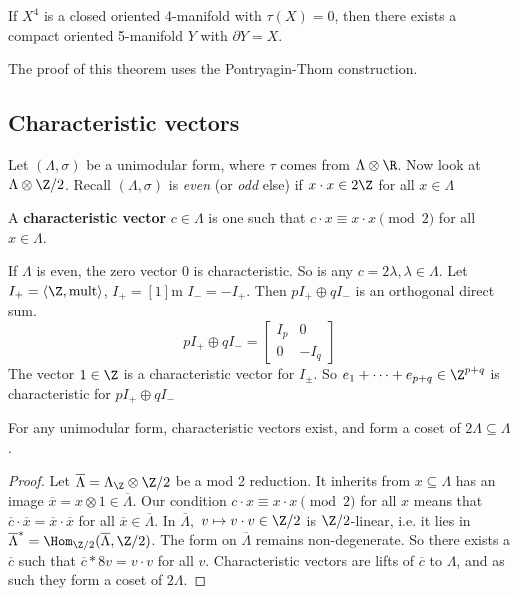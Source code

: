 \begin{theorem}[Thom, 1952]
    If $X^4$ is a closed oriented 4-manifold with $\tau(X)=0$, then there exists a compact oriented 5-manifold $Y$ with $\partial  Y =X$. 
\end{theorem}
The proof of this theorem uses the Pontryagin-Thom construction.

\subsection{Characteristic vectors}
Let $(\Lambda, \sigma)$ be a unimodular form, where $\tau$ comes from $\Lambda \otimes \R$. Now look at $\Lambda \otimes \Z /2$. Recall $(\Lambda, \sigma)$ is \emph{even} (or \emph{odd} else) if $x \cdot  x \in  2\Z$ for all $x \in \Lambda$
\begin{definition}[]
    A \textbf{characteristic vector} $c \in \Lambda$ is one such that $c \cdot  x \equiv x \cdot  x \pmod 2$ for all $x \in \Lambda$.
\end{definition}
\begin{example}
    If $\Lambda  $ is even, the zero vector $0$ is characteristic. So is any $c=2\lambda, \lambda \in \Lambda$. Let $I_+ = \langle \Z, \mathrm{mult} \rangle $, $I_+ = [1]$m $I_- = -I_+$. Then $p I_+ \oplus q I_-$ is an orthogonal direct sum. \[
    pI_+ \oplus qI_- = 
    \begin{bmatrix}
        I_p & 0 \\ 0 & -I_q
    \end{bmatrix}
    \] The vector $1 \in \Z$ is a characteristic vector for $I_{\pm}$. So $e_1 + \cdots + e _{p+q} \in \Z ^{p+q}$ is characteristic for $p I_+ \oplus q I_-$
\end{example}
\begin{prop}
    For any unimodular form, characteristic vectors exist, and form a coset of $2 \Lambda \subseteq  \Lambda$.
\end{prop}
\begin{proof}
    Let $\overline{\Lambda} = \Lambda _{\Z}\otimes \Z /2$ be a mod 2 reduction. It inherits from $x \subseteq \Lambda$ has an image $\overline{x} = x\otimes 1 \in  \overline{\Lambda}$. Our condition $c \cdot  x \equiv x \cdot  x \pmod 2$ for all $x$ means that $\overline{c} \cdot  \overline{x}= \overline{x}\cdot \overline{x}$ for all $\overline{x} \in \overline{\Lambda}$. In $\overline{\Lambda},$ $v \mapsto  v\cdot v  \in \Z /2$ is $\Z /2$-linear, i.e. it lies in $\overline{\Lambda}^*=\Hom _{\Z /2}(\overline{\Lambda}, \Z/2)$. The form on $\overline{\Lambda}$ remains non-degenerate. So there exists a $\overline{c}$ such that $\overline{c}*8 v = v \cdot  v $ for all $v$. Characteristic vectors are lifts of $\overline{c}$ to $\Lambda$, and as such they form a coset of $2\Lambda$.
\end{proof}
